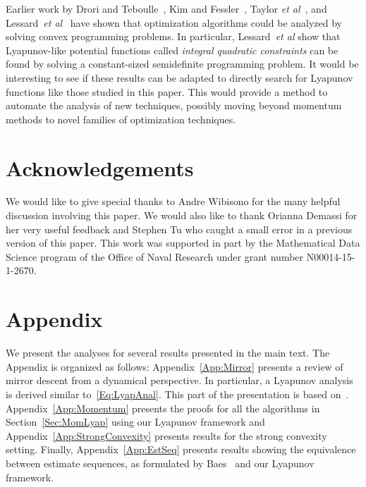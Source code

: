 \documentclass[11pt]{article}
\theoremstyle{plain}
\begin{document}
Earlier work by Drori and Teboulle~\cite{DroriTeboulle13}, Kim and Fessler~\cite{Kim2016}, Taylor \emph{et al}~\cite{Taylor2016}, and Lessard~\emph{et al}~\cite{Lessard14} have shown that optimization algorithms could be analyzed by solving convex programming problems.  In particular, Lessard~\emph{et al} show that Lyapunov-like potential functions called \emph{integral quadratic constraints} can be found by solving a constant-sized semidefinite programming problem. It would be interesting to see if these results can be adapted to directly search for Lyapunov functions like those studied in this paper.  This would provide a method to automate the analysis of new techniques, possibly moving beyond momentum methods to novel families of optimization techniques.

\section*{Acknowledgements}
We would like to give special thanks to Andre Wibisono for the many helpful discussion involving this paper. We would also like to thank Orianna Demassi for her very useful feedback and Stephen Tu who caught a small error in a previous version of this paper.  This work was supported in part by the Mathematical Data Science program of the Office of Naval Research under grant number N00014-15-1-2670.



\clearpage
\appendix
\section*{Appendix}
We present the analyses for several results presented in the main text. The Appendix is organized as follows: Appendix~\ref{App:Mirror} presents a review of mirror descent from a dynamical perspective. In particular,  a Lyapunov analysis is derived similar to~\eqref{Eq:LyapAnal}. This part of the presentation is based on~\cite{NemirovskiiYudin}. Appendix~\ref{App:Momentum} presents the proofs for all the algorithms in Section~\ref{Sec:MomLyap} using our Lyapunov framework and Appendix~\ref{App:StrongConvexity} presents results for the strong convexity setting. Finally, Appendix~\ref{App:EstSeq} presents results showing the equivalence between estimate sequences, as formulated by Baes~\cite{Baes09} and our Lyapunov framework. 
\end{document}
